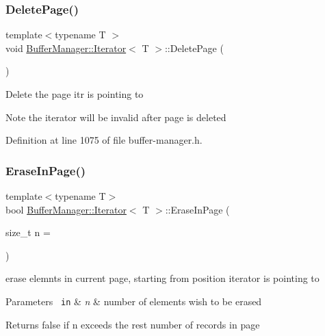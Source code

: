 \subsubsection{\texorpdfstring{DeletePage()}{DeletePage()}}
{\footnotesize\ttfamily template$<$typename T $>$ \\
void \mbox{\hyperlink{class_buffer_manager_1_1_iterator}{Buffer\+Manager\+::\+Iterator}}$<$ T $>$\+::Delete\+Page (\begin{DoxyParamCaption}{ }\end{DoxyParamCaption})\hspace{0.3cm}{\ttfamily [inline]}}

Delete the page itr is pointing to \begin{DoxyNote}{Note}
the iterator will be invalid after page is deleted 
\end{DoxyNote}


Definition at line 1075 of file buffer-\/manager.\+h.

\mbox{\label{class_buffer_manager_1_1_iterator_a2c627998f19999fe55b7452b840ce47b}} 
\subsubsection{\texorpdfstring{EraseInPage()}{EraseInPage()}}
{\footnotesize\ttfamily template$<$typename T$>$ \\
bool \mbox{\hyperlink{class_buffer_manager_1_1_iterator}{Buffer\+Manager\+::\+Iterator}}$<$ T $>$\+::Erase\+In\+Page (\begin{DoxyParamCaption}\item[{size\+\_\+t}]{n = {} }\end{DoxyParamCaption})\hspace{0.3cm}{\ttfamily [inline]}}

erase elemnts in current page, starting from position iterator is pointing to 
\begin{DoxyParams}[1]{Parameters}
\mbox{\texttt{ in}}  & {\em n} & number of elements wish to be erased \\
\hline
\end{DoxyParams}
\begin{DoxyReturn}{Returns}
false if {\ttfamily n} exceeds the rest number of records in page 
\end{DoxyReturn}


